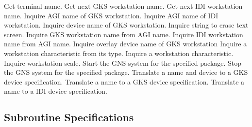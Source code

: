 \begin{routinelist}
   Get terminal name.
   Get next GKS workstation name.
   Get next IDI workstation name.
   Inquire AGI name of GKS workstation.
   Inquire AGI name of IDI workstation.
   Inquire device name of GKS workstation.
   Inquire string to erase text screen.
   Inquire GKS workstation name from AGI name.
   Inquire IDI workstation name from AGI name.
   Inquire overlay device name of GKS workstation
   Inquire a workstation characteristic from its type.
   Inquire a workstation characteristic.
   Inquire workstation scale.
   Start the GNS system for the specified package.
   Stop the GNS system for the specified package.
   Translate a name and device to a GKS device specification.
   Translate a name to a GKS device specification.
   Translate a name to a IDI device specification.
\end{routinelist}

\newcommand{\latexonlysection}[1]{\subsection{#1}}
\begin{htmlonly}
\renewcommand{\latexonlysection}[1]{}
\end{htmlonly}
\latexonlysection{Subroutine Specifications}





